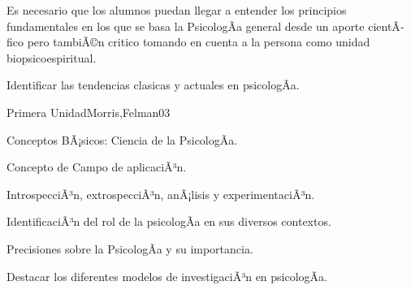 \begin{syllabus}


\begin{justification}
Es necesario que los alumnos puedan llegar a entender los principios fundamentales en  los que se basa la PsicologÃ­a general desde un aporte cientÃ­fico pero tambiÃ©n critico tomando en cuenta a la persona como unidad biopsicoespiritual.
\end{justification}

\begin{goals}
\item Identificar las tendencias clasicas y actuales en psicologÃ­a.
\end{goals}

\begin{outcomes}
\end{outcomes}

\begin{unit}{Primera Unidad}{Morris,Felman}{0}{3}
\begin{topics}
	\item Conceptos BÃ¡sicos: Ciencia de la PsicologÃ­a.
	\item Concepto de Campo de aplicaciÃ³n.
	\item IntrospecciÃ³n, extrospecciÃ³n, anÃ¡lisis y experimentaciÃ³n.
\end{topics}
\begin{unitgoals}
	\item IdentificaciÃ³n del rol de la psicologÃ­a en sus diversos contextos.
	\item Precisiones sobre la PsicologÃ­a y su importancia.
	\item Destacar los diferentes modelos de investigaciÃ³n en psicologÃ­a.
\end{unitgoals}
\end{unit}


\end{syllabus}
